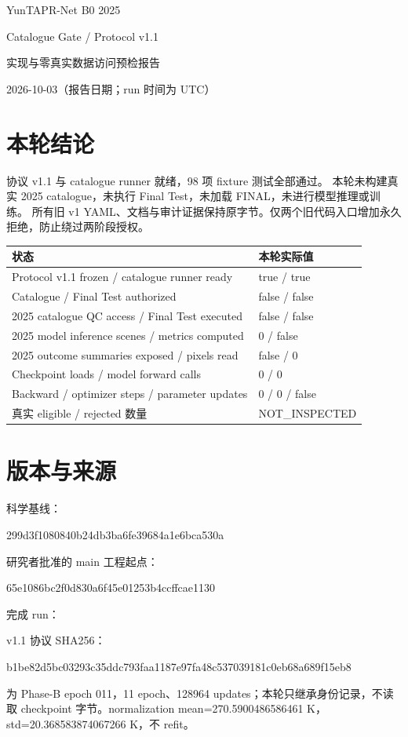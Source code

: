 \documentclass[11pt,a4paper]{ctexart}
\newcommand{\code}[1]{\texttt{\detokenize{#1}}}
\begin{document}
\begin{center}
{\LARGE YunTAPR-Net B0 2025}\par
{\Large Catalogue Gate / Protocol v1.1}\par
{\large 实现与零真实数据访问预检报告}\par
2026-10-03（报告日期；run 时间为 UTC）
\end{center}
\section*{本轮结论}
协议 v1.1 与 catalogue runner 就绪，98 项 fixture 测试全部通过。
本轮未构建真实 2025 catalogue，未执行 Final Test，未加载 FINAL，未进行模型推理或训练。
所有旧 v1 YAML、文档与审计证据保持原字节。仅两个旧代码入口增加永久拒绝，防止绕过两阶段授权。

\begin{tabular}{ll}
\toprule 状态 & 本轮实际值\\\midrule
Protocol v1.1 frozen / catalogue runner ready & true / true\\
Catalogue / Final Test authorized & false / false\\
2025 catalogue QC access / Final Test executed & false / false\\
2025 model inference scenes / metrics computed & 0 / false\\
2025 outcome summaries exposed / pixels read & false / 0\\
Checkpoint loads / model forward calls & 0 / 0\\
Backward / optimizer steps / parameter updates & 0 / 0 / false\\
真实 eligible / rejected 数量 & NOT\_INSPECTED\\\bottomrule
\end{tabular}

\section*{版本与来源}
科学基线：\par{\small\ttfamily 299d3f1080840b24db3ba6fe39684a1e6bca530a}\par
研究者批准的 main 工程起点：\par{\small\ttfamily 65e1086bc2f0d830a6f45e01253b4ccffcae1130}\par
完成 run：\par{\small\ttfamily{}}\par
v1.1 协议 SHA256：\par{\small\ttfamily b1be82d5bc03293c35ddc793faa1187e97fa48c537039181c0eb68a689f15eb8}\par
\code{FINAL} 为 Phase-B epoch 011，11 epoch、128964 updates；本轮只继承身份记录，不读取 checkpoint 字节。normalization mean=270.5900486586461 K，std=20.368583874067266 K，不 refit。
\end{document}
